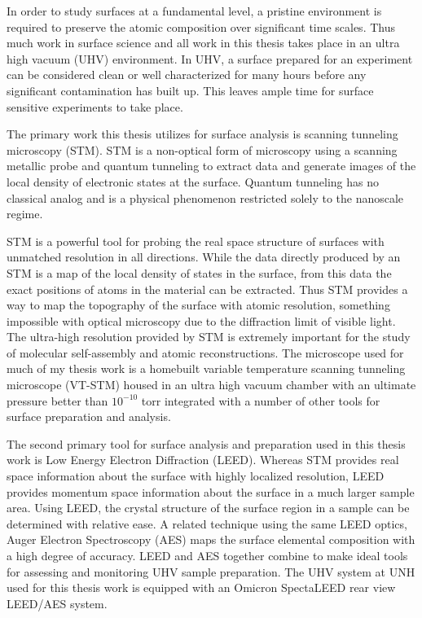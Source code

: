 In order to study surfaces at a fundamental level, a pristine environment is required to preserve the atomic composition over significant time scales. Thus much work in surface science and all work in this thesis takes place in an ultra high vacuum (UHV) environment. In UHV, a surface prepared for an experiment can be considered clean or well characterized for many hours before any significant contamination has built up. This leaves ample time for surface sensitive experiments to take place.

The primary work this thesis utilizes for surface analysis is scanning tunneling microscopy (STM). STM is a non-optical form of microscopy using a scanning metallic probe and quantum tunneling to extract data and generate images of the local density of electronic states at the surface. Quantum tunneling has no classical analog and is a physical phenomenon restricted solely to the nanoscale regime.

STM is a powerful tool for probing the real space structure of surfaces with unmatched resolution in all directions. While the data directly produced by an STM is a map of the local density of states in the surface, from this data the exact positions of atoms in the material can be extracted. Thus STM provides a way to map the topography of the surface with atomic resolution, something impossible with optical microscopy due to the diffraction limit of visible light. The ultra-high resolution provided by STM is extremely important for the study of molecular self-assembly and atomic reconstructions. The microscope used for much of my thesis work is a homebuilt variable temperature scanning tunneling microscope (VT-STM) housed in an ultra high vacuum chamber with an ultimate pressure better than $10^{-10}$ torr integrated with a number of other tools for surface preparation and analysis.

The second primary tool for surface analysis and preparation used in this thesis work is Low Energy Electron Diffraction (LEED). Whereas STM provides real space information about the surface with highly localized resolution, LEED provides momentum space information about the surface in a much larger sample area. Using LEED, the crystal structure of the surface region in a sample can be determined with relative ease. A related technique using the same LEED optics, Auger Electron Spectroscopy (AES) maps the surface elemental composition with a high degree of accuracy. LEED and AES together combine to make ideal tools for assessing and monitoring UHV sample preparation. The UHV system at UNH used for this thesis work is equipped with an Omicron SpectaLEED rear view LEED/AES system.

